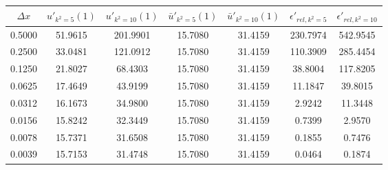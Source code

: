 \begin{tabular}{|c|c|c|c|c|c|c|}
\hline
\textbf{$\Delta x$}&\textbf{$u'_{k^2=5}(1)$}&\textbf{$u'_{k^2=10}(1)$}&\textbf{$\bar{u}'_{k^2=5}(1)$}&\textbf{$\bar{u}'_{k^2=10}(1)$}&\textbf{$\epsilon'_{rel,k^2=5}$}&\textbf{$\epsilon'_{rel,k^2=10}$}\\\hline
0.5000&51.9615&201.9901&15.7080&31.4159&230.7974&542.9545\\\hline
0.2500&33.0481&121.0912&15.7080&31.4159&110.3909&285.4454\\\hline
0.1250&21.8027&68.4303&15.7080&31.4159&38.8004&117.8205\\\hline
0.0625&17.4649&43.9199&15.7080&31.4159&11.1847&39.8015\\\hline
0.0312&16.1673&34.9800&15.7080&31.4159&2.9242&11.3448\\\hline
0.0156&15.8242&32.3449&15.7080&31.4159&0.7399&2.9570\\\hline
0.0078&15.7371&31.6508&15.7080&31.4159&0.1855&0.7476\\\hline
0.0039&15.7153&31.4748&15.7080&31.4159&0.0464&0.1874\\\hline
\end{tabular}
